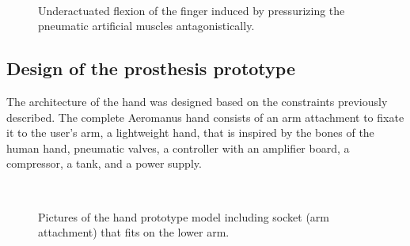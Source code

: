 \documentclass[main]{subfiles}
\begin{document}
\begin{figure}[H]
\centering
{}
\\
\caption[Underactuated flexion]{Underactuated flexion of the finger induced by pressurizing the pneumatic artificial muscles antagonistically.}
\end{figure}

\subsection{Design of the prosthesis prototype}

The architecture of the hand was designed based on the constraints previously described. The complete Aeromanus hand consists of an arm attachment to fixate it to the user's arm, a lightweight hand, that is inspired by the bones of the human hand, pneumatic valves, a controller with an amplifier board, a compressor, a tank, and a power supply.

\begin{figure}[htp]
\centering
{}\hspace{0.03\textwidth}
\\
\caption[Hand prototype]{Pictures of the hand prototype model including socket (arm attachment) that fits on the lower arm.}
\end{figure}
\end{document}
